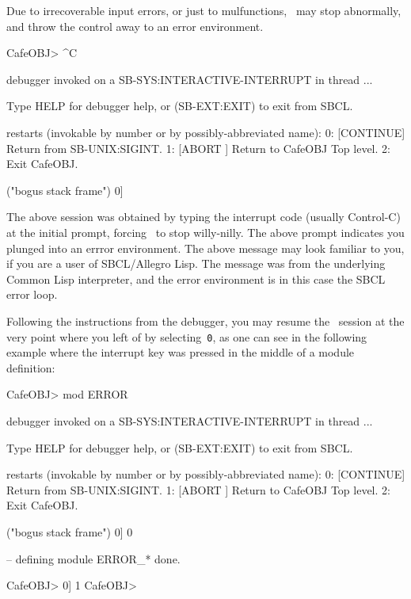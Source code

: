 \documentclass[a4paper]{memoir}
\begin{document}
Due to irrecoverable input errors, or just to mulfunctions, \cafeobj
~may stop abnormally, and throw the control away to an error environment.
\begin{vvtm}
\begin{ccode}
  CafeOBJ> ^C

  debugger invoked on a SB-SYS:INTERACTIVE-INTERRUPT in thread ...

  Type HELP for debugger help, or (SB-EXT:EXIT) to exit from SBCL.

  restarts (invokable by number or by possibly-abbreviated name):
    0: [CONTINUE] Return from SB-UNIX:SIGINT.
    1: [ABORT   ] Return to CafeOBJ Top level.
    2:            Exit CafeOBJ.

  ("bogus stack frame")
  0] 
\end{ccode}
\end{vvtm}
The above session was obtained by typing the interrupt code (usually
Control-C) at the initial prompt, forcing \cafeobj~to stop willy-nilly.
The above prompt indicates you plunged into an errror
environment. The above message may look familiar to you, if you are
a user of SBCL/Allegro Lisp. The message was from the underlying
Common Lisp interpreter, and the error environment is in this case the
SBCL error loop.%

Following the instructions from the debugger, you may resume the
\cafeobj~session at the very point where you left of by
selecting~\verb|0|, as one can see in the following example where the
interrupt key was pressed in the middle of a module definition:
\begin{vvtm}
\begin{ccode}
  CafeOBJ> mod ERROR {

  debugger invoked on a SB-SYS:INTERACTIVE-INTERRUPT in thread ...

  Type HELP for debugger help, or (SB-EXT:EXIT) to exit from SBCL.

  restarts (invokable by number or by possibly-abbreviated name):
    0: [CONTINUE] Return from SB-UNIX:SIGINT.
    1: [ABORT   ] Return to CafeOBJ Top level.
    2:            Exit CafeOBJ.

  ("bogus stack frame")
  0] 0
  }

  -- defining module ERROR_* done.

  CafeOBJ>
  0] 1
  CafeOBJ>
\end{ccode}
\end{vvtm}
\end{document}
